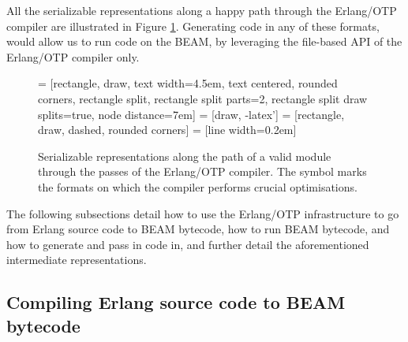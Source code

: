 All the serializable representations along a happy path through the
Erlang/OTP compiler are illustrated in Figure
\ref{fig:serializable-representations}. Generating code in any of
these formats, would allow us to run code on the BEAM, by leveraging
the file-based API of the Erlang/OTP compiler only. 

\NewDocumentCommand\optimizing{}{$\circlearrowright$}

\begin{figure}[ht!]
\centering
{} = [rectangle, draw, 
    text width=4.5em, text centered, rounded corners,
    rectangle split, rectangle split parts=2,
    rectangle split draw splits=true,
    node distance=7em]
 = [draw, -latex']
 = [rectangle, draw, dashed, rounded corners]
 = [line width=0.2em]


\caption{Serializable representations along the path of a valid module
through the passes of the Erlang/OTP compiler. The symbol
\optimizing{} marks the formats on which the compiler performs crucial
optimisations.}

\label{fig:serializable-representations}
\end{figure}

The following subsections detail how to use the Erlang/OTP
infrastructure to go from Erlang source code to BEAM bytecode, how to
run BEAM bytecode, and how to generate and pass in code in, and
further detail the aforementioned intermediate representations.

\subsection{Compiling Erlang source code to BEAM bytecode}


